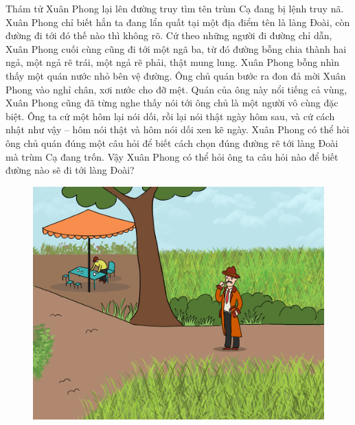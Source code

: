 \begin{multicols}{2}
	Thám tử Xuân Phong lại lên đường truy tìm tên trùm Cạ đang bị lệnh truy nã. Xuân Phong chỉ biết hắn ta đang lẩn quất tại một địa điểm tên là làng Đoài, còn đường đi tới đó thế nào thì không rõ. Cứ theo những người đi đường chỉ dẫn, Xuân Phong cuối cùng cũng đi tới một ngã ba, từ đó đường bỗng chia thành hai ngả, một ngả rẽ trái, một ngả rẽ phải, thật mung lung. Xuân Phong bỗng nhìn thấy một quán nước nhỏ bên vệ đường. Ông chủ quán bước ra đon đả mời Xuân Phong vào nghỉ chân, xơi nước cho đỡ mệt. Quán của ông này nổi tiếng cả vùng, Xuân Phong cũng đã từng nghe thấy nói tới ông chủ là một người vô cùng đặc biệt. Ông ta cứ một hôm lại nói dối, rồi lại nói thật ngày hôm sau, và cứ cách nhật như vậy -- hôm nói thật và hôm nói dối xen kẽ ngày. Xuân Phong có thể hỏi ông chủ quán đúng một câu hỏi để biết cách chọn đúng đường rẽ tới làng Đoài mà trùm Cạ đang trốn. Vậy Xuân Phong có thể hỏi ông ta câu hỏi nào để biết đường nào sẽ đi tới \linebreak làng Đoài?
\end{multicols}
	\begin{figure}[H]
	\vspace*{-5pt}
	\centering
	\captionsetup{labelformat= empty, justification=centering}
	\includegraphics[width= 1\linewidth]{xp2}
	\vspace*{-10pt}
\end{figure}
\newpage
\begingroup
